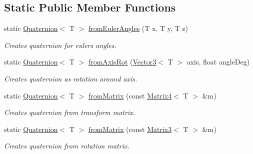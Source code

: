 \subsection*{Static Public Member Functions}
\begin{DoxyCompactItemize}
\item 
static \hyperlink{class_quaternion}{Quaternion}$<$ T $>$ \hyperlink{class_quaternion_ab7409771454937a4d18e5c65ec237af7}{fromEulerAngles} (T x, T y, T z)
\begin{DoxyCompactList}\small\item\em Creates quaternion for eulers angles. \item\end{DoxyCompactList}\item 
static \hyperlink{class_quaternion}{Quaternion}$<$ T $>$ \hyperlink{class_quaternion_ae1853336ac63f00a63249167ee3b86bd}{fromAxisRot} (\hyperlink{class_vector3}{Vector3}$<$ T $>$ axis, float angleDeg)
\begin{DoxyCompactList}\small\item\em Creates quaternion as rotation around axis. \item\end{DoxyCompactList}\item 
static \hyperlink{class_quaternion}{Quaternion}$<$ T $>$ \hyperlink{class_quaternion_a6444beef0766cd0351408efe45b2a312}{fromMatrix} (const \hyperlink{class_matrix4}{Matrix4}$<$ T $>$ \&m)
\begin{DoxyCompactList}\small\item\em Creates quaternion from transform matrix. \item\end{DoxyCompactList}\item 
static \hyperlink{class_quaternion}{Quaternion}$<$ T $>$ \hyperlink{class_quaternion_a9782ce0b6a21cd183d2c4c6cccbdccb7}{fromMatrix} (const \hyperlink{class_matrix3}{Matrix3}$<$ T $>$ \&m)
\begin{DoxyCompactList}\small\item\em Creates quaternion from rotation matrix. \item\end{DoxyCompactList}\end{DoxyCompactItemize}
